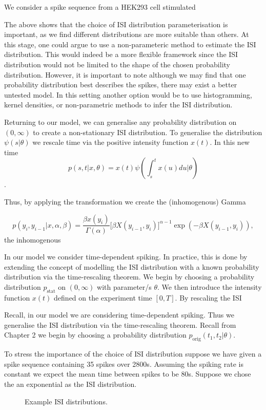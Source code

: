 \documentclass[../main.tex]{subfiles}
\begin{document}
We consider a spike sequence from a HEK293 cell stimulated 



The above shows that the choice of ISI distribution parameterisation is important, as we find different distributions are more suitable than others. 
At this stage, one could argue to use a non-parameteric method to estimate the ISI distribution. This would indeed be a more flexible framework since the ISI distribution would not be limited to the shape of the chosen probability distribution. 
However, it is important to note although we may find that one probability distribution best describes the  spikes, there may exist a better untested model. 
In this setting another option would be to use histogramming, kernel densities, or non-parametric methods to infer the ISI distribution. 
 

Returning to our model, we can generalise any probability distribution on $(0,\infty)$ to create a non-stationary ISI distribution. To generalise the distribution $\psi(s|\theta)$ we rescale time via the positive intensity function $x(t)$. In this new time 
$$ p(s,t |x,\theta) = x(t)\psi (\int^t_s x(u)du|\theta) $$.

Thus, by applying the transformation we create the (inhomogenous) Gamma

$$
 p(y_i, y_{i-1}| x, \alpha, \beta) =  \frac{\beta x(y_i)}{\Gamma ( \alpha )} \big[ \beta X(y_{i-1} , y_i ) \big]^{\alpha -1} \exp( - \beta X(y_{i-1} , y_i )  ),
$$
 the inhomogenous




In our model we consider time-dependent  spiking. In practice, this is done by extending the concept of modelling the ISI distribution with a known probability distribution via the time-rescaling theorem. We begin by choosing a probability distribution $p_{\mathrm{stat}}$ on $(0,\infty)$ with parameter/s $\theta$. We then introduce the intensity function $x(t)$ defined on the experiment time $[0,T]$. By rescaling the ISI 

Recall, in our model we are considering time-dependent  spiking. Thus we generalise the ISI distribution via the time-rescaling theorem. Recall from Chapter 2 we begin by choosing a probability distribution $p_{\mathrm{orig}}(t_1,t_2 | \theta)$. 


To stress the importance of the choice of ISI distribution suppose we have given a spike sequence containing 35 spikes over 2800s. Assuming the spiking rate is constant we expect the mean time between spikes to be 80s. Suppose we chose the an exponential as the ISI distribution. 
  \begin{figure}[t]
   \hrulefill
   \begin{center} 
    \end{center}     
    \caption{Example ISI distributions.   }
    \label{fig:ExampleISI}
    \hrulefill
    \end{figure}
\end{document}
